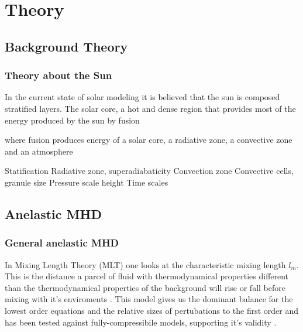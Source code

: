 \chapter{Theory}
\section{Background Theory}
\subsection{Theory about the Sun}
In the current state of solar modeling it is believed that the sun is composed stratified layers. The solar core, a hot and dense region that provides most of the energy produced by the sun by fusion

\citep{1996Sci...272.1286C}

where fusion produces energy
of a solar core, a radiative zone, a convective zone and an atmosphere


Statification
Radiative zone, superadiabaticity
Convection zone
Convective cells, granule size
Pressure scale height
Time scales


\section{Anelastic MHD}
\subsection{General anelastic MHD}

In Mixing Length Theory (MLT) one looks at the characteristic mixing length $l_m$. This is the distance a parcel of fluid with thermodynamical properties different than the thermodynamical properties of the background will rise or fall before mixing with it's enviroments \citep{1925ZaMM....5..136P}. This model gives us the dominant balance for the lowest order equations and the relative sizes of pertubations to the first order \citep{1999ApJS..121..247L} and has been tested against fully-compressibile models, supporting it's validity \citep{1989ApJ...336.1022C}. 

